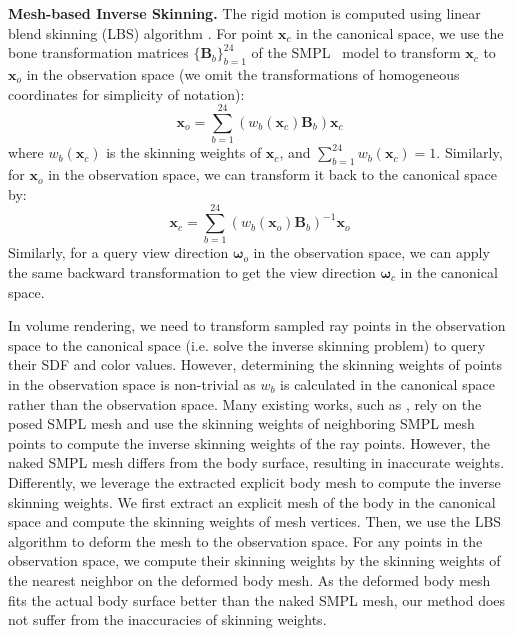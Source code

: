 \textbf{Mesh-based Inverse Skinning.}
The rigid motion is computed using linear blend skinning (LBS) algorithm \cite{pose_deformation}.
For point $\mathbf{x}_c$ in the canonical space, we use the bone transformation matrices $\{\mathbf{B}_b\}^{24}_{b=1}$ of the SMPL~\cite{loper2015smpl} model to transform $\mathbf{x}_c$ to $\mathbf{x}_o$ in the observation space (we omit the transformations of homogeneous coordinates for simplicity of notation):
\begin{equation}
    \mathbf{x}_o = \sum_{b=1}^{24} \left( w_b(\mathbf{x}_c) \mathbf{B}_b \right) \mathbf{x}_c
\end{equation}
where $w_b(\mathbf{x}_c)$ is the skinning weights of $\mathbf{x}_c$, and $\sum_{b=1}^{24} w_b(\mathbf{x}_c) = 1$.
Similarly, for $\mathbf{x}_o$ in the observation space, we can transform it back to the canonical space by:
\begin{equation}
    \mathbf{x}_c = \sum_{b=1}^{24} \left( w_b(\mathbf{x}_o) \mathbf{B}_b \right)^{-1} \mathbf{x}_o
\end{equation}
Similarly, for a query view direction $\mathbf{\omega}_o$ in the observation space, we can apply the same backward transformation to get the view direction $\mathbf{\omega}_c$ in the canonical space.

In volume rendering, we need to transform sampled ray points in the observation space to the canonical space (i.e. solve the inverse skinning problem) to query their SDF and color values.
However, determining the skinning weights of points in the observation space is non-trivial as $w_b$ is calculated in the canonical space rather than the observation space.
Many existing works, such as \cite{animatablenerf, peng2022animatable, humannerf}, rely on the posed SMPL mesh and use the skinning weights of neighboring SMPL mesh points to compute the inverse skinning weights of the ray points.
However, the naked SMPL mesh differs from the body surface, resulting in inaccurate weights.
Differently, we leverage the extracted explicit body mesh to compute the inverse skinning weights.
We first extract an explicit mesh of the body in the canonical space and compute the skinning weights of mesh vertices. 
Then, we use the LBS algorithm to deform the mesh to the observation space.
For any points in the observation space, we compute their skinning weights by the skinning weights of the nearest neighbor on the deformed body mesh.
As the deformed body mesh fits the actual body surface better than the naked SMPL mesh, our method does not suffer from the inaccuracies of skinning weights.

